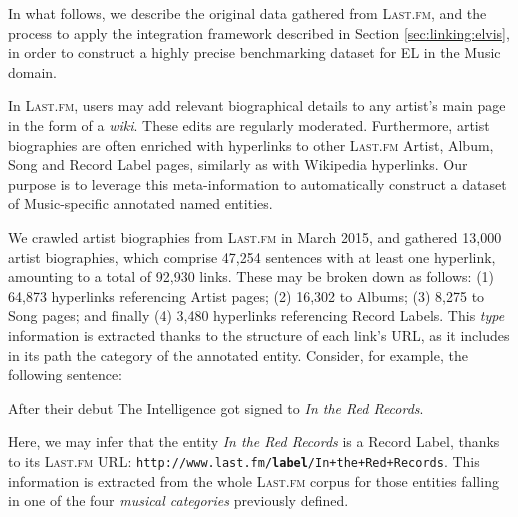 In what follows, we describe the original data gathered from \textsc{Last.fm}, and the process to apply the integration framework described in Section \ref{sec:linking:elvis}, in order to construct a highly precise benchmarking dataset for EL in the Music domain.


In \textsc{Last.fm}, users may add relevant biographical details to any artist's main page in the form of a \textit{wiki}. These edits are regularly moderated. Furthermore, artist biographies are often enriched with hyperlinks to other \textsc{Last.fm} Artist, Album, Song and Record Label pages, similarly as with Wikipedia hyperlinks. Our purpose is to leverage this meta-information to automatically construct a dataset of Music-specific annotated named entities.%

We crawled artist biographies from \textsc{Last.fm} in March 2015, and gathered 13,000 artist biographies, which comprise 47,254 sentences with at least one hyperlink, amounting to a total of 92,930 links. These may be broken down as follows: (1) 64,873 hyperlinks referencing Artist pages; (2) 16,302 to Albums; (3) 8,275 to Song pages; and finally (4) 3,480 hyperlinks referencing Record Labels. This \textit{type} information is extracted thanks to the structure of each link's URL, as it includes in its path the category of the annotated entity. Consider, for example, the following sentence:

\begin{adjustwidth}{2.5em}{20pt}
\begin{center}
After their debut The Intelligence got signed to \textit{In the Red Records}.\\
\end{center}
\end{adjustwidth}


Here, we may infer that the entity \textit{In the Red Records} is a Record Label, thanks to its \textsc{Last.fm} URL: {\footnotesize{\texttt{http://www.last.fm/{\normalsize\textbf{label}}/In+the+Red+Records}}}. This information is extracted from the whole \textsc{Last.fm} corpus for those entities falling in one of the four \textit{musical categories} previously defined.


